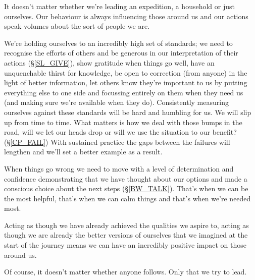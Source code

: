 \cleardoublepage
\begin{multicols}{2}

It doesn't matter whether we're leading an expedition, a household or just ourselves. Our behaviour is always influencing those around us and our actions speak volumes about the sort of people we are.

We're holding ourselves to an incredibly high set of standards; we need to recognise the efforts of others and be generous in our interpretation of their actions (\S \ref{SL_GIVE}), show gratitude when things go well, have an unquenchable thirst for knowledge, be open to correction (from anyone) in the light of better information, let others know they're important to us by putting everything else to one side and focussing entirely on them when they need us (and making sure we're available when they do). Consistently measuring ourselves against these standards will be hard and humbling for us. We will slip up from time to time. What matters is how we deal with those bumps in the road, will we let our heads drop or will we use the situation to our benefit? (\S \ref{CP_FAIL}) With sustained practice the gaps between the failures will lengthen and we'll set a better example as a result.

When things go wrong we need to move with a level of determination and confidence demonstrating that we have thought about our options and made a conscious choice about the next steps (\S \ref{BW_TALK}). That's when we can be the most helpful, that's when we can calm things and that's when we're needed most.

Acting as though we have already achieved the qualities we aspire to, acting as though we are already the better versions of ourselves that we imagined at the start of the journey means we can have an incredibly positive impact on those around us.

Of course, it doesn't matter whether anyone follows. Only that we try to lead.

\end{multicols}
\clearpage
